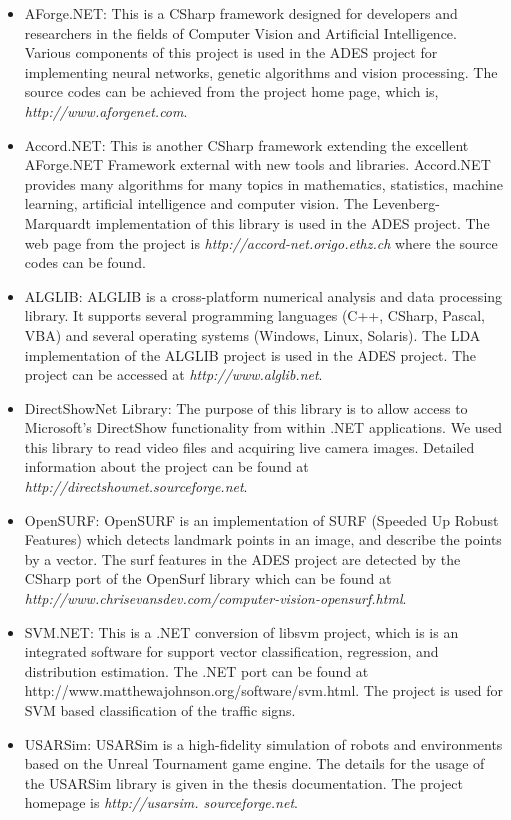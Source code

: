 \documentclass[a4paper,oneside,12pt]{report}
\begin{document}
\begin{itemize}
	\item AForge.NET: This is a CSharp framework designed for developers and researchers in the fields of Computer Vision and Artificial Intelligence. Various components of this project is used in the ADES project for implementing neural networks, genetic algorithms and vision processing. The source codes can be achieved from the project home page, which is, \textit{http://www.aforgenet.com}.
	\item Accord.NET: This is another CSharp framework extending the excellent AForge.NET Framework external with new tools and libraries. Accord.NET provides many algorithms for many topics in mathematics, statistics, machine learning, artificial intelligence and computer vision. The Levenberg-Marquardt implementation of this library is used in the ADES project. The web page from the project is \textit{http://accord-net.origo.ethz.ch} where the source codes can be found.
	\item ALGLIB: ALGLIB is a cross-platform numerical analysis and data processing library. It supports several programming languages (C++, CSharp, Pascal, VBA) and several operating systems (Windows, Linux, Solaris). The LDA implementation of the ALGLIB project is used in the ADES project. The project can be accessed at \textit{http://www.alglib.net}.
	\item DirectShowNet Library: The purpose of this library is to allow access to Microsoft's DirectShow functionality from within .NET applications. We used this library to read video files and acquiring live camera images. Detailed information about the project can be found at \textit{http://directshownet.sourceforge.net}.
	\item OpenSURF: OpenSURF is an implementation of SURF (Speeded Up Robust Features) which detects landmark points in an image, and describe the points by a vector. The surf features in the ADES project are detected by the CSharp port of the OpenSurf library which can be found at \textit{http://www.chrisevansdev.com/computer-vision-opensurf.html}.
	\item SVM.NET: This is a .NET conversion of libsvm project, which is is an integrated software for support vector classification, regression, and distribution estimation. The .NET port can be found at {http://www.matthewajohnson.org/software/svm.html}. The project is used for SVM based classification of the traffic signs.
	\item USARSim: USARSim is a high-fidelity simulation of robots and environments based on the Unreal Tournament game engine. The details for the usage of the USARSim library is given in the thesis documentation. The project homepage is \textit{http://usarsim. sourceforge.net}.

\end{itemize}
\end{document}
